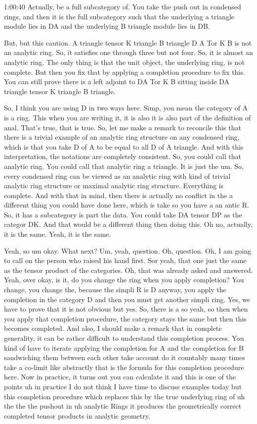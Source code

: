 \begin{unfinished}{1:00:40}
Actually, be a full subcategory of. You take the push out in condensed rings, and then it is the full subcategory such that the underlying a triangle module lies in DA and the underlying B triangle module lies in DB.

But, but this caution. A triangle tensor K triangle B triangle D A Tor K B is not an analytic ring. So, it satisfies one through three but not four. So, it is almost an analytic ring. The only thing is that the unit object, the underlying ring, is not complete. But then you fix that by applying a completion procedure to fix this. You can still prove there is a left adjoint to DA Tor K B sitting inside DA triangle tensor K triangle B triangle.

So, I think you are using D in two ways here. Simp, you mean the category of A is a ring. This when you are writing it, it is also it is also part of the definition of anal. That's true, that is  true. So, let me make a remark to reconcile this that there is a trivial example of an analytic ring structure on any condensed ring, which is that you take D of A to be equal to all D of A triangle. And with this interpretation, the notations are completely consistent. So, you could call that analytic ring. You could call that analytic ring a triangle. It is  just the um. So, every condensed ring can be viewed as an analytic ring with kind of trivial analytic ring structure or maximal analytic ring structure. Everything is complete. And with that in mind, then there is actually no conflict in the a different thing you could have done here, which is take so you have a an antic R. So, it has a subcategory is part the data. You could take DA tensor DP as the categor DK. And that would be a different thing then doing this. Oh no, actually, it is the same. Yeah, it is the same.

Yeah, so um okay. What next? Um, yeah, question. Oh, question. Oh, I am going to call on the person who raised his hand first. Sor yeah, that one just the same as the tensor product of the categories. Oh, that was already asked and answered. Yeah, over okay, is it, do you change the ring when you apply completion? You change, you change the, because the simpli R is D anyway, you apply the completion in the category D and then you must get another simpli ring. Yes, we have to prove that it is not obvious but yes. So, there is a so yeah, so then when you apply that completion procedure, the category stays the same but then this becomes completed. And also, I should make a remark that in complete generality, it can be rather difficult to understand this completion process. You kind of have to iterate applying the completion for A and the completion for B sandwiching them between each other take account do it countably many times take a co-limit like abstractly that is  the formula for this completion procedure here. Now in practice, it turns out you can calculate it and this is one of the points uh in practice I do not think I have time to discuss examples today but this completion procedure which replaces this by the true underlying ring of uh the the the pushout in uh analytic Rings it produces the geometrically correct completed tensor products in analytic geometry.


\end{unfinished}
